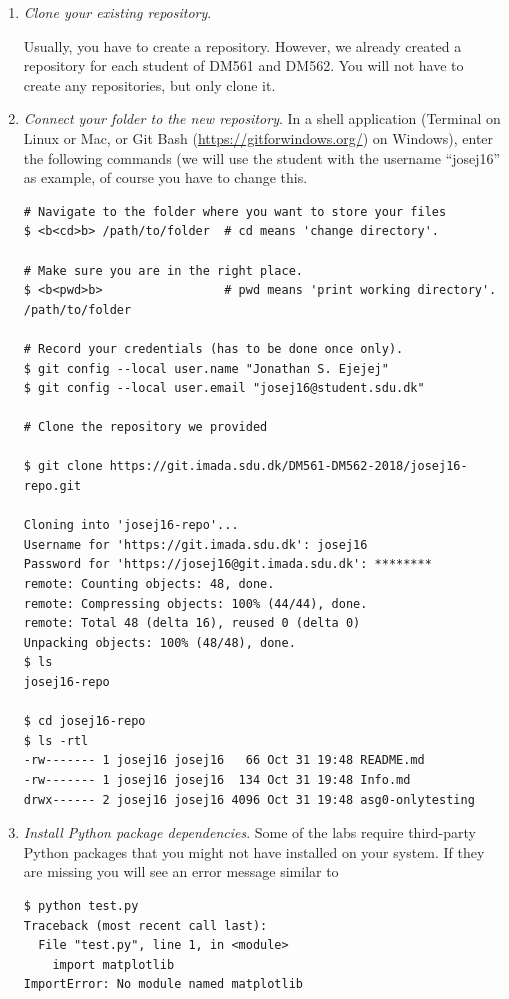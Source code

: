 \begin{enumerate}

\item \emph{Clone your existing repository}.

  Usually, you have to create a repository. However, we already created a repository for each student of DM561 and DM562. You will not have to create any repositories, but only clone it.
  
\item \emph{Connect your folder to the new repository}.
\label{step:connect-folder}\label{step:download-data}
In a shell application (Terminal on Linux or Mac, or Git Bash (\url{https://gitforwindows.org/}) on Windows), enter the following commands (we will use the student with the username ``josej16'' as example, of course you have to change this.

\begin{lstlisting}
# Navigate to the folder where you want to store your files
$ <b<cd>b> /path/to/folder  # cd means 'change directory'.

# Make sure you are in the right place.
$ <b<pwd>b>                 # pwd means 'print working directory'.
/path/to/folder

# Record your credentials (has to be done once only).
$ git config --local user.name "Jonathan S. Ejejej"
$ git config --local user.email "josej16@student.sdu.dk"

# Clone the repository we provided

$ git clone https://git.imada.sdu.dk/DM561-DM562-2018/josej16-repo.git

Cloning into 'josej16-repo'...
Username for 'https://git.imada.sdu.dk': josej16
Password for 'https://josej16@git.imada.sdu.dk': ********
remote: Counting objects: 48, done.
remote: Compressing objects: 100% (44/44), done.
remote: Total 48 (delta 16), reused 0 (delta 0)
Unpacking objects: 100% (48/48), done.
$ ls 
josej16-repo

$ cd josej16-repo
$ ls -rtl
-rw------- 1 josej16 josej16   66 Oct 31 19:48 README.md
-rw------- 1 josej16 josej16  134 Oct 31 19:48 Info.md
drwx------ 2 josej16 josej16 4096 Oct 31 19:48 asg0-onlytesting
\end{lstlisting}


\item \emph{Install Python package dependencies}.
\label{step:install-dependencies}
Some of the labs require third-party Python packages that you might not have installed on your system. If they are missing you will see an error message similar to 
\begin{lstlisting}
$ python test.py 
Traceback (most recent call last):
  File "test.py", line 1, in <module>
    import matplotlib
ImportError: No module named matplotlib
\end{lstlisting}


\end{enumerate}
